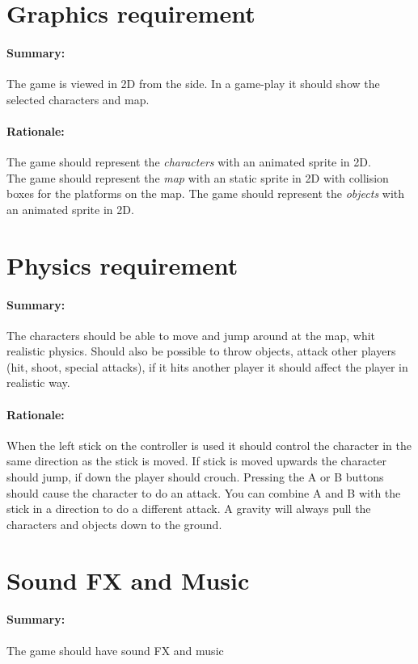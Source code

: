 \section{Graphics requirement}
	\paragraph{Summary:}
		The game is viewed in 2D from the side. In a game-play it should show the selected characters and map.
	\paragraph{Rationale:}
		The game should represent the \emph{characters} with an animated sprite in 2D.\\
		The game should represent the \emph{map} with an static sprite in 2D with collision boxes for the platforms on the map.
		The game should represent the \emph{objects} with an animated sprite in 2D.

\section{Physics requirement}
	\paragraph{Summary:}
		The characters should be able to move and jump around at the map, whit realistic physics. Should also be possible to throw objects, attack other players (hit, shoot, special attacks), if it hits another player it should affect the player in realistic way.
	\paragraph{Rationale:}
		When the left stick on the controller is used it should control the character in the same direction as the stick is moved. If stick is moved upwards the character should jump, if down the player should crouch. 
		Pressing the A or B buttons should cause the character to do an attack. You can combine A and B with the stick in a direction to do a different attack.
		A gravity will always pull the characters and objects down to the ground.

\section{Sound FX and Music}
	\paragraph{Summary:}
		The game should have sound FX and music
